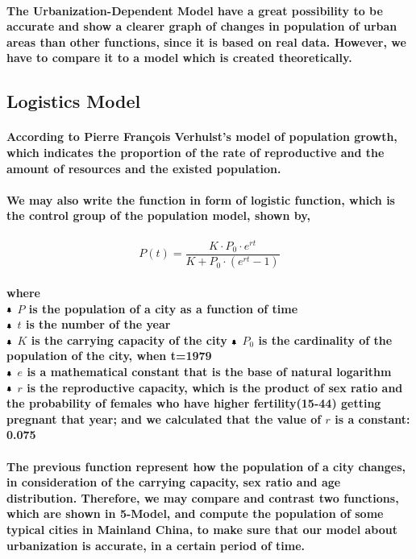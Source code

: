 \documentclass{article}
\begin{document}
\paragraph{The Urbanization-Dependent Model have a great possibility to be accurate and show a clearer graph of changes in population of urban areas than other functions, since it is based on real data. However, we have to compare it to a model which is created theoretically. }

\subsection{Logistics Model}
\paragraph{According to Pierre François Verhulst's model of population growth, which indicates the proportion of the rate of reproductive and the amount of resources and the existed population. }

\paragraph{We may also write the function in form of logistic function, which is the control group of the population model, shown by, }
\paragraph{$$P(t)=\frac{K\cdot P_0\cdot e^{rt}}{K+P_0\cdot (e^{rt}-1)}$$}
\paragraph{where \\
$\bell$ $P$ is the population of a city as a function of time \\
$\bell$ $t$ is the number of the year \\
$\bell$ $K$ is the carrying capacity of the city
$\bell$ $P_0$ is the cardinality of the population of the city, when t=1979 \\
$\bell$ $e$ is a mathematical constant that is the base of natural logarithm \\
$\bell$ $r$ is the reproductive capacity, which is the product of sex ratio and the probability of females who have higher fertility(15-44) getting pregnant that year; and we calculated that the value of $r$ is a constant: 0.075}

\paragraph{The previous function represent how the population of a city changes, in consideration of the carrying capacity, sex ratio and age distribution. Therefore, we may compare and contrast two functions, which are shown in 5-Model, and compute the population of some typical cities in Mainland China, to make sure that our model about urbanization is accurate, in a certain period of time. }
\end{document}
